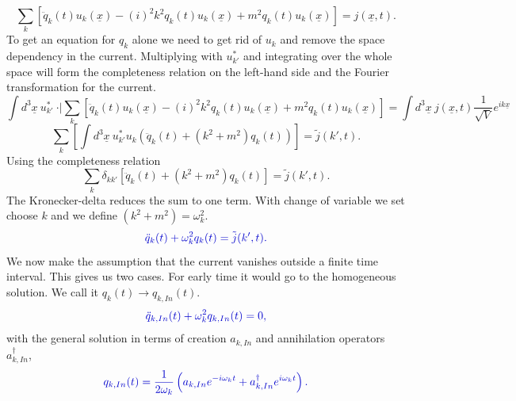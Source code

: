 \documentclass[12pt, titlepage]{article}
\begin{document}
\begin{equation}
 \sum_{k}
 \left[ 
	\ddot{q}_{k}(t)u_{k}(\underline{x})
	-(i)^{2}k^{2}q_{k}(t)u_{k}(\underline{x})
	+m^{2}q_{k}(t)u_{k}(\underline{x})
 \right] 
  =j(\underline{x},t).
\end{equation}
To get an equation for $ q_{k} $ alone we need to get rid of $ u_{k} $ and remove the space dependency in the current. Multiplying with $ u^{\ast}_{k'} $ and integrating over the whole space will form the completeness relation on the left-hand side and the Fourier transformation for the current.
\begin{equation}
\int d^{3}\underline{x} \ 
u^{\ast}_{k'}
\ \cdot
\vert 
 \sum_{k}
 \left[ 
	\ddot{q}_{k}(t)u_{k}(\underline{x})
	-(i)^{2}k^{2}q_{k}(t)u_{k}(\underline{x})
	+m^{2}q_{k}(t)u_{k}(\underline{x})
 \right] 
 =
 \int d^{3}\underline{x} \ 
j(\underline{x},t) \dfrac{1}{\sqrt{V}} e^{ik\underline{x}}
\end{equation}
\begin{equation}
 \sum_{k}
 \left[ 
 \int d^{3}\underline{x} \ u^{\ast}_{k'}u_{k}
 \left( 
 \ddot{q}_{k}(t) 
 +
 \left( k^{2}+m^{2}\right) 
 q_{k}(t) 
 \right) 
  \right] 
  =\tilde{j}(k',t).
\end{equation}
Using the completeness relation 
\begin{equation}
 \sum_{k}
 \delta_{kk'}
 \left[ 
 \ddot{q}_{k}(t) 
 +
 \left( k^{2}+m^{2}\right) 
 q_{k}(t) 
  \right] 
  =\tilde{j}(k',t).
\end{equation}
The Kronecker-delta reduces the sum to one term. With change of variable we set choose $ k $ and we define $ (k^{2}+m^{2}) = \omega_{k}^{2} $.
\begin{equation}\label{eq_for_q}
 \textcolor[RGB]{0,0,204}{
\ddot{q}_{k}(t) 
 +
\omega_{k}^{2}
 q_{k}(t) 
  =\tilde{j}(k',t)
  .}
\end{equation}
We now make the assumption that the current vanishes outside a finite time interval. 
This gives us two cases. For early time it would go to the homogeneous solution. We call it $ q_{k}(t) \rightarrow q_{k,In}(t) $.
\begin{equation}\label{eq_for_q_In}
 \textcolor[RGB]{0,0,204}{
\ddot{q}_{k,In}(t) 
 +
\omega_{k}^{2}
 q_{k,In}(t) 
  =0
  ,}
\end{equation}
with the general solution in terms of creation $ a_{k,In} $ and annihilation operators $ a^{\dagger}_{k,In} $,
\begin{equation}\label{q_In_operators}
 \textcolor[RGB]{0,0,204}{
 q_{k,In}(t) 
  =
  \dfrac{1}{2\omega_{k}}\left(
	a_{k,In} 
	e^{-i\omega_{k}t}
	+
	a^{\dagger}_{k,In}  
	e^{i\omega_{k}t}
  \right) 
  .}
\end{equation}
\end{document}
